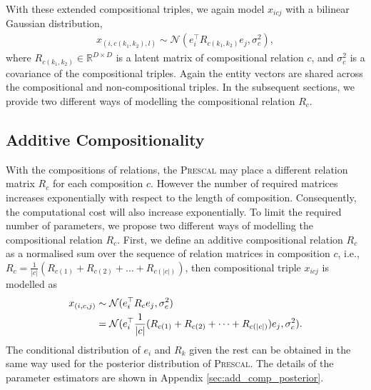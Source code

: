 With these extended compositional triples, we again model $x_{icj}$ with a bilinear Gaussian distribution,
\begin{align}
x_{(i, {{c}(k_1, k_2)}, l)} \sim \mathcal{N}(e_i^\top R_{{c}(k_1,k_2)} e_j, \sigma_{c}^2),
\end{align}
where $R_{{c}(k_1,k_2)} \in \mathbb{R}^{D\times D}$ is a latent matrix of compositional relation $c$, and $
\sigma_{c}^2$ is a covariance of the compositional triples. Again the entity vectors are shared across the compositional and non-compositional triples.
In the subsequent sections, we provide two different ways of modelling the compositional relation $R_c$.

\subsection{Additive Compositionality}
With the compositions of relations, the \textsc{Prescal} may place a different relation matrix $R_c$ for each composition $c$. However the number of required matrices increases exponentially with respect to the length of composition. Consequently, the computational cost will also increase exponentially.
To limit the required number of parameters, we propose two different ways of modelling the compositional relation $R_c$.
First, we define an additive compositional relation $R_c$ as a normalised sum over
the sequence of relation matrices in composition $c$, i.e.,
$R_{{c}} = \frac{1}{|c|}(R_{c(1)} + R_{c(2)} + \dots + R_{c(|c|)})$, then compositional triple $x_{icj}$
is modelled as
\begin{align}
x_{(i, c, j)} &\sim \mathcal{N}(e_i^\top R_c e_j, \sigma_{c}^2) \\
&= \mathcal{N}(e_i^\top \frac{1}{|c|}(R_{c(1)} + R_{c(2)} + \dots + R_{c(|c|)}) e_j, \sigma_{c}^2). \notag
\end{align}
The conditional distribution of $e_i$ and $R_k$ given the rest can be obtained in the same way used for the posterior distribution of \textsc{Prescal}. The details of the parameter estimators are shown in Appendix \ref{sec:add_comp_posterior}.

